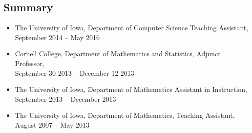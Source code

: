 \subsection*{Summary}
\begin{itemize}
\item The University of Iowa, Department of Computer Science Teaching
  Assistant, \\ September 2014 -- May 2016
\item Cornell College, Department of Mathematics and Statistics,
  Adjunct Professor, \\ September 30 2013 -- December 12 2013
\item The University of Iowa, Department of Mathematics Assistant in
  Instruction, \\ September 2013 -- December 2013
\item The University of Iowa, Department of Mathematics, Teaching
  Assistant, \\ August 2007 -- May 2013
\end{itemize}
